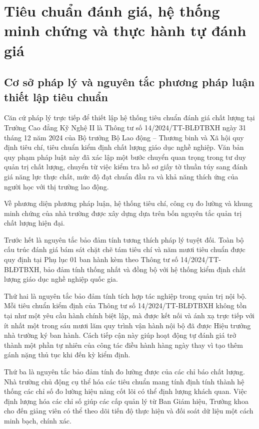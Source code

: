 \section{Tiêu chuẩn đánh giá, hệ thống minh chứng và thực hành tự đánh giá}

\subsection{Cơ sở pháp lý và nguyên tắc phương pháp luận thiết lập tiêu chuẩn}

Căn cứ pháp lý trực tiếp để thiết lập hệ thống tiêu chuẩn đánh giá chất lượng tại Trường Cao đẳng Kỹ Nghệ II là Thông tư số 14/2024/TT-BLĐTBXH ngày 31 tháng 12 năm 2024 của Bộ trưởng Bộ Lao động -- Thương binh và Xã hội quy định tiêu chí, tiêu chuẩn kiểm định chất lượng giáo dục nghề nghiệp. Văn bản quy phạm pháp luật này đã xác lập một bước chuyển quan trọng trong tư duy quản trị chất lượng, chuyển từ việc kiểm tra hồ sơ giấy tờ thuần túy sang đánh giá năng lực thực chất, mức độ đạt chuẩn đầu ra và khả năng thích ứng của người học với thị trường lao động.

Về phương diện phương pháp luận, hệ thống tiêu chí, công cụ đo lường và khung minh chứng của nhà trường được xây dựng dựa trên bốn nguyên tắc quản trị chất lượng hiện đại. 

Trước hết là nguyên tắc bảo đảm tính tương thích pháp lý tuyệt đối. Toàn bộ cấu trúc đánh giá bám sát chặt chẽ tám tiêu chí và năm mươi tiêu chuẩn được quy định tại Phụ lục 01 ban hành kèm theo Thông tư số 14/2024/TT-BLĐTBXH, bảo đảm tính thống nhất và đồng bộ với hệ thống kiểm định chất lượng giáo dục nghề nghiệp quốc gia.

Thứ hai là nguyên tắc bảo đảm tính tích hợp tác nghiệp trong quản trị nội bộ. Mỗi tiêu chuẩn kiểm định của Thông tư số 14/2024/TT-BLĐTBXH không tồn tại như một yêu cầu hành chính biệt lập, mà được kết nối và ánh xạ trực tiếp với ít nhất một trong sáu mươi lăm quy trình vận hành nội bộ đã được Hiệu trưởng nhà trường ký ban hành. Cách tiếp cận này giúp hoạt động tự đánh giá trở thành một phần tự nhiên của công tác điều hành hàng ngày thay vì tạo thêm gánh nặng thủ tục khi đến kỳ kiểm định.

Thứ ba là nguyên tắc bảo đảm tính đo lường được của các chỉ báo chất lượng. Nhà trường chủ động cụ thể hóa các tiêu chuẩn mang tính định tính thành hệ thống các chỉ số đo lường hiệu năng cốt lõi có thể định lượng khách quan. Việc định lượng hóa các chỉ số giúp các cấp quản lý từ Ban Giám hiệu, Trưởng khoa cho đến giảng viên có thể theo dõi tiến độ thực hiện và đối soát dữ liệu một cách minh bạch, chính xác.

